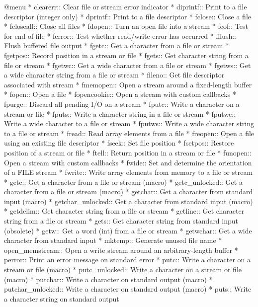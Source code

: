 @menu
* clearerr::    Clear file or stream error indicator
* diprintf::    Print to a file descriptor (integer only)
* dprintf::     Print to a file descriptor
* fclose::      Close a file
* fcloseall::   Close all files
* fdopen::      Turn an open file into a stream
* feof::        Test for end of file
* ferror::      Test whether read/write error has occurred
* fflush::      Flush buffered file output
* fgetc::       Get a character from a file or stream
* fgetpos::     Record position in a stream or file
* fgets::       Get character string from a file or stream
* fgetwc::      Get a wide character from a file or stream
* fgetws::      Get a wide character string from a file or stream
* fileno::      Get file descriptor associated with stream
* fmemopen::    Open a stream around a fixed-length buffer
* fopen::       Open a file
* fopencookie:: Open a stream with custom callbacks
* fpurge::      Discard all pending I/O on a stream
* fputc::       Write a character on a stream or file
* fputs::       Write a character string in a file or stream
* fputwc::      Write a wide character to a file or stream
* fputws::      Write a wide character string to a file or stream
* fread::       Read array elements from a file
* freopen::     Open a file using an existing file descriptor
* fseek::       Set file position
* fsetpos::     Restore position of a stream or file
* ftell::       Return position in a stream or file
* funopen::     Open a stream with custom callbacks
* fwide::	Set and determine the orientation of a FILE stream
* fwrite::      Write array elements from memory to a file or stream
* getc::        Get a character from a file or stream (macro)
* getc_unlocked::	Get a character from a file or stream (macro)
* getchar::     Get a character from standard input (macro)
* getchar_unlocked::	Get a character from standard input (macro)
* getdelim::    Get character string from a file or stream
* getline::     Get character string from a file or stream
* gets::        Get character string from standard input (obsolete)
* getw::        Get a word (int) from a file or stream
* getwchar::    Get a wide character from standard input
* mktemp::      Generate unused file name
* open_memstream::	Open a write stream around an arbitrary-length buffer
* perror::      Print an error message on standard error
* putc::        Write a character on a stream or file (macro)
* putc_unlocked::	Write a character on a stream or file (macro)
* putchar::     Write a character on standard output (macro)
* putchar_unlocked::	Write a character on standard output (macro)
* puts::        Write a character string on standard output
